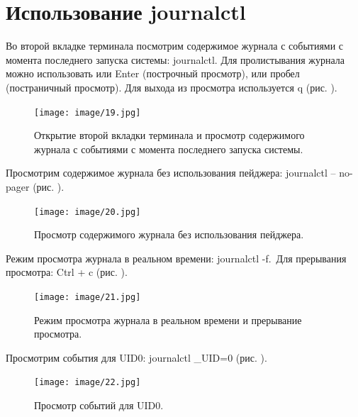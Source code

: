 \documentclass[
  english,
  russian,
  12pt,
  a4paper,
  DIV=11,
  numbers=noendperiod]{scrreprt}
\begin{document}
\section{Использование
journalctl}\label{ux438ux441ux43fux43eux43bux44cux437ux43eux432ux430ux43dux438ux435-journalctl}

Во второй вкладке терминала посмотрим содержимое журнала с событиями с
момента последнего запуска системы: journalctl. Для пролистывания
журнала можно использовать или Enter (построчный просмотр), или пробел
(постраничный просмотр). Для выхода из просмотра используется q (рис.
\autocite*{fig:019}).

\begin{figure}

{\centering \texttt{[image: image/19.jpg]}

}

\caption{Открытие второй вкладки терминала и просмотр содержимого
журнала с событиями с момента последнего запуска системы.}

\end{figure}%

Просмотрим содержимое журнала без использования пейджера: journalctl --
no-pager (рис. \autocite*{fig:020}).

\begin{figure}

{\centering \texttt{[image: image/20.jpg]}

}

\caption{Просмотр содержимого журнала без использования пейджера.}

\end{figure}%

Режим просмотра журнала в реальном времени: journalctl -f.~Для
прерывания просмотра: Ctrl + c (рис. \autocite*{fig:021}).

\begin{figure}

{\centering \texttt{[image: image/21.jpg]}

}

\caption{Режим просмотра журнала в реальном времени и прерывание
просмотра.}

\end{figure}%

Просмотрим события для UID0: journalctl \_UID=0 (рис.
\autocite*{fig:022}).

\begin{figure}

{\centering \texttt{[image: image/22.jpg]}

}

\caption{Просмотр событий для UID0.}

\end{figure}%
\end{document}
